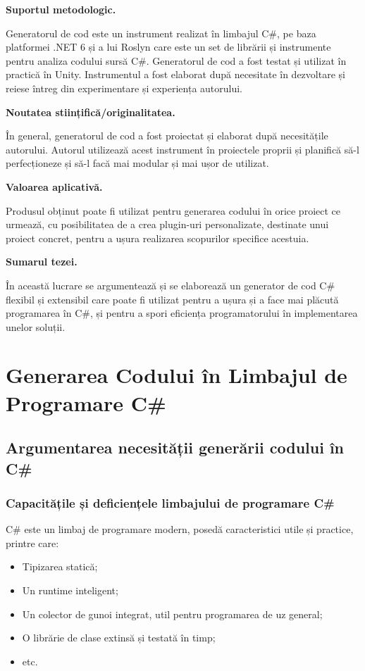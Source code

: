 \documentclass[a4paper,12pt]{report}
\begin{document}
\textbf{Suportul metodologic.}

Generatorul de cod este un instrument realizat în limbajul C\#, pe baza platformei {{.}NET} 6 și a lui Roslyn care este un set de librării și instrumente pentru analiza codului sursă C\#.
Generatorul de cod a fost testat și utilizat în practică în Unity.
Instrumentul a fost elaborat după necesitate în dezvoltare și reiese întreg din experimentare și experiența autorului.

\textbf{Noutatea stiințifică/originalitatea.}

În general, generatorul de cod a fost proiectat și elaborat după necesitățile autorului.
Autorul utilizează acest instrument în proiectele proprii și planifică să-l perfecționeze și să-l facă mai modular și mai ușor de utilizat.

\textbf{Valoarea aplicativă.}

Produsul obținut poate fi utilizat pentru generarea codului în orice proiect ce urmează,
cu posibilitatea de a crea plugin-uri personalizate, destinate unui proiect concret,
pentru a ușura realizarea scopurilor specifice acestuia.

\textbf{Sumarul tezei.}

În această lucrare se argumentează și se elaborează un generator de cod C\# flexibil și extensibil care poate fi utilizat pentru a ușura și a face mai plăcută programarea în C\#, și pentru a spori eficiența programatorului în implementarea unelor soluții.


\chapter{Generarea Codului în Limbajul de Programare C\#}\label{intro_chapter_title}

\section{Argumentarea necesității generării codului în C\#}

\subsection{Capacitățile și deficiențele limbajului de programare C\#}

{C\# este un limbaj de programare modern, posedă caracteristici utile și practice}\cite{tour_of_csharp}, printre care:
\begin{itemize}
  \item Tipizarea statică;
  \item Un runtime inteligent;
  \item Un colector de gunoi integrat, util pentru programarea de uz general;
  \item O librărie de clase extinsă și testată în timp;
  \item etc.
\end{itemize}
\end{document}
